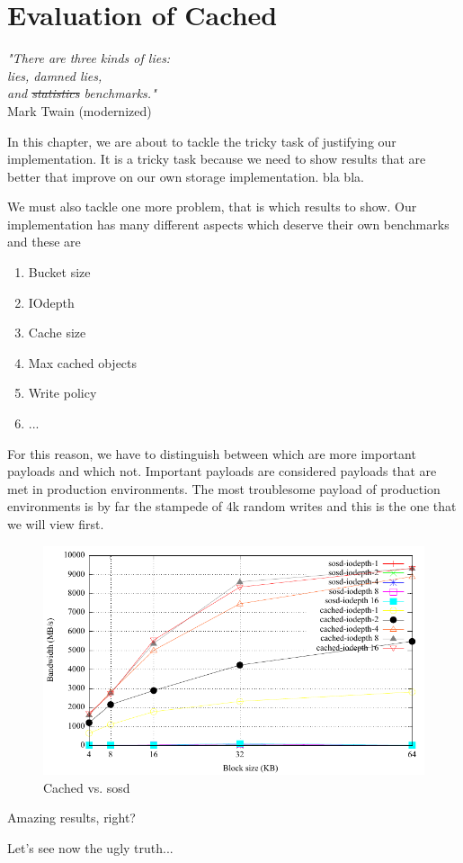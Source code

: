 \chapter{Evaluation of Cached}\label{ch:cached-evaluation}

\begin{flushright}
	\textit{"There are three kinds of lies:\\
		lies, damned lies, \\
		and \sout{statistics} benchmarks."}	\\

	Mark Twain (modernized)
\end{flushright}

In this chapter, we are about to tackle the tricky task of justifying our 
implementation. It is a tricky task because we need to show results that are 
better that improve on our own storage implementation. bla bla.

We must also tackle one more problem, that is which results to show. Our 
implementation has many different aspects which deserve their own benchmarks and 
these are

\begin{enumerate}
	\item Bucket size
	\item IOdepth
	\item Cache size
	\item Max cached objects
	\item Write policy
	\item ...
\end{enumerate}

For this reason, we have to distinguish between which are more important 
payloads and which not. Important payloads are considered payloads that are met 
in production environments. The most troublesome payload of production 
environments is by far the stampede of 4k random writes and this is the one that 
we will view first.

\begin{figure}[hb]
	\centering
	\includegraphics[]{diagrams/out.pdf}
	\caption{Cached vs. sosd}
	\label{fig:comp}
\end{figure}


Amazing results, right?

Let's see now the ugly truth...


